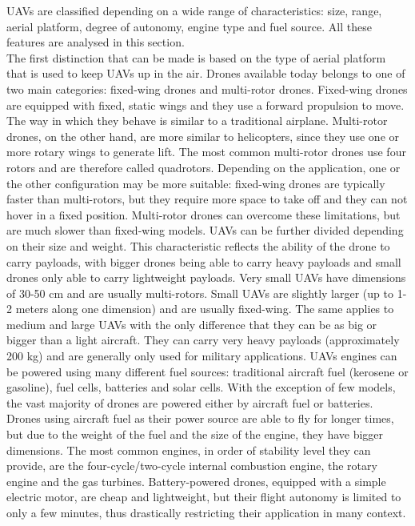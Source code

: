 \glspl{UAV} are classified depending on a wide range of characteristics: size, range, aerial platform, degree of autonomy, engine type and fuel source. All these features are analysed in this section. \\
The first distinction that can be made is based on the type of aerial platform that is used to keep \glspl{UAV} up in the air. Drones available today belongs to one of two main categories: fixed-wing drones and multi-rotor drones. Fixed-wing drones are equipped with fixed, static wings and they use a forward propulsion to move. The way in which they behave is similar to a traditional airplane. Multi-rotor drones, on the other hand, are more similar to helicopters, since they use one or more rotary wings to generate lift. The most common multi-rotor drones use four rotors and are therefore called quadrotors. Depending on the application, one or the other configuration may be more suitable: fixed-wing drones are typically faster than multi-rotors, but they require more space to take off and they can not hover in a fixed position. Multi-rotor drones can overcome these limitations, but are much slower than fixed-wing models.
\glspl{UAV} can be further divided depending on their size and weight. This characteristic reflects the ability of the drone to carry payloads, with bigger drones being able to carry heavy payloads and small drones only able to carry lightweight payloads. Very small \glspl{UAV} have dimensions of 30-50 cm and are usually multi-rotors. Small \glspl{UAV} are slightly larger (up to 1-2 meters along one dimension) and are usually fixed-wing. The same applies to medium and large \glspl{UAV} with the only difference that they can be as big or bigger than a light aircraft. They can carry very heavy payloads (approximately 200 kg) and are generally only used for military applications. 
\glspl{UAV} engines can be powered using many different fuel sources: traditional aircraft fuel (kerosene or gasoline), fuel cells, batteries and solar cells. With the exception of few models, the vast majority of drones are powered either by aircraft fuel or batteries. Drones using aircraft fuel as their power source are able to fly for longer times, but due to the weight of the fuel and the size of the engine, they have bigger dimensions. The most common engines, in order of stability level they can provide, are the four-cycle/two-cycle internal combustion engine, the rotary engine and the gas turbines. Battery-powered drones, equipped with a simple electric motor, are cheap and lightweight, but their flight autonomy is limited to only a few minutes, thus drastically restricting their application in many context.

